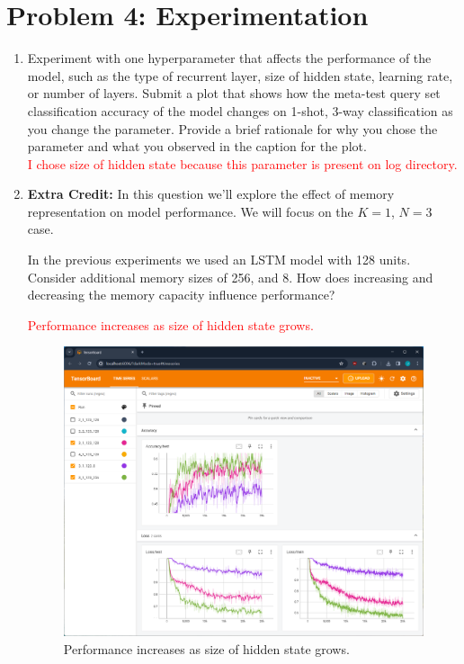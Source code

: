 \documentclass[12pt]{article}
\begin{document}
\section*{Problem 4: Experimentation}
\begin{enumerate}[label=\alph*]
    \item Experiment with one hyperparameter that affects the performance of the model, such as the type of recurrent layer, size of hidden state, learning rate, or number of layers.  Submit a plot that shows how the meta-test query set classification accuracy of the model changes on 1-shot, 3-way classification as you change the parameter. Provide a brief rationale for why you chose the parameter and what you observed in the caption for the plot.\\    
    \textcolor{red}{I chose size of hidden state because this parameter is present on log directory.}
    
    
    \item \textbf{Extra Credit:} In this question we'll explore the effect of memory representation on model performance. We will focus on the $K=1$, $N=3$ case.
    
    In the previous experiments we used an LSTM model with 128 units. Consider additional memory sizes of 256, and 8. How does increasing and decreasing the memory capacity influence performance?
    
    \textcolor{red}{Performance increases as size of hidden state grows.}
    
\begin{figure}
\centering
\includegraphics[width=\linewidth]{figures/problem4.png}
\caption{Performance increases as size of hidden state grows.}
\end{figure}
\end{enumerate}


\newpage


\end{document}
